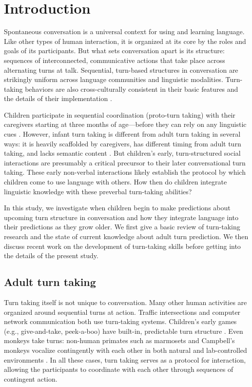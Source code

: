 \documentclass[authoryear, 12pt]{elsarticle}
\begin{document}
\linenumbers

\section*{Introduction}
\label{sec:intro}

Spontaneous conversation is a universal context for using and learning language. Like other types of human interaction, it is organized at its core by the roles and goals of its participants. But what sets conversation apart is its structure: sequences of interconnected, communicative actions that take place across alternating turns at talk. Sequential, turn-based structures in conversation are strikingly uniform across language communities and linguistic modalities. Turn-taking behaviors are also cross-culturally consistent in their basic features and the details of their implementation \citep{de-vos2015, dingemanse2013, stivers2009}. 

Children participate in sequential coordination (proto-turn taking) with their caregivers starting at three months of age---before they can rely on any linguistic cues \citep[see, among others, ][]{bateson1975, hilbrink2015, jaffe2001, snow1977}. However, infant turn taking is different from adult turn taking in several ways: it is heavily scaffolded by caregivers, has different timing from adult turn taking, and lacks semantic content \citep{hilbrink2015, jaffe2001}. But children's early, turn-structured social interactions are presumably a critical precursor to their later conversational turn taking. These early non-verbal interactions likely establish the protocol by which children come to use language with others. How then do children integrate linguistic knowledge with these preverbal turn-taking abilities? 

In this study, we investigate when children begin to make predictions about upcoming turn structure in conversation and how they integrate language into their predictions as they grow older. We first give a basic review of turn-taking research and the state of current knowledge about adult turn prediction. We then discuss recent work on the development of turn-taking skills before getting into the details of the present study.

\subsection*{Adult turn taking}

Turn taking itself is not unique to conversation. Many other human activities are organized around sequential turns at action. Traffic intersections and computer network communication both use turn-taking systems. Children's early games (e.g., give-and-take, peek-a-boo) have built-in, predictable turn structure \citep{ratner1978, ross1987}. Even monkeys take turns: non-human primates such as marmosets and Campbell's monkeys vocalize contingently with each other in both natural and lab-controlled environments \citep{lemasson2011, takahashi2013}. In all these cases, turn taking serves as a protocol for interaction, allowing the participants to coordinate with each other through sequences of contingent action. 
\end{document}
